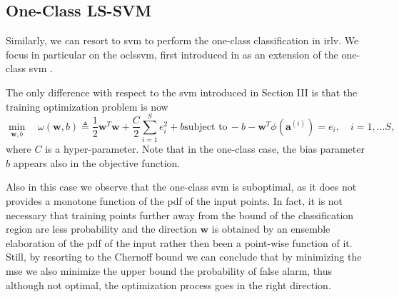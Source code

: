 \documentclass[draftcls,onecolumn,12pt]{IEEEtran}
\begin{document}
\subsection{One-Class LS-SVM}

Similarly, we can resort to \ac{svm} to perform the one-class classification in \ac{irlv}. We focus in particular on the  \ac{oclssvm}, first introduced in \cite{choi2009least} as an extension of the one-class \ac{svm} \cite{Scholkopf2001estimating}. 

The only difference with respect to the \ac{svm} introduced in Section III is that the training optimization problem is now
\begin{subequations}
	\label{eq:oneClassSvm}
	\begin{equation}
	\label{eq:oneClass1}
	\underset{\bm{w},b}{\min} \quad \omega(\bm{w}, b) \triangleq
	 \frac{1}{2} \bm{w}^T \bm{w} +  \frac{C}{2} \sum_{i=1}^S e_i^2 +b
	\end{equation}
	\begin{equation}
	\label{eq:oneClassConstr}
	\text{subject to}\, -b - \bm{w}^T \phi (\bm{a}^{(i)})  = e_i,  \quad i = 1,\dots S, 
	\end{equation}
\end{subequations}
where $C$ is a hyper-parameter.
Note that in the one-class case, the bias parameter $b$ appears also in the objective function.


Also in this case we observe that the one-class \ac{svm} is suboptimal, as it does not provides a monotone function of the \ac{pdf} of the input points. In fact, it is not necessary that  training points further away from the bound of the classification region are less probability and the direction $\bm{w}$ is obtained by an ensemble elaboration of the \ac{pdf} of the input rather then been a point-wise function of it. Still, by resorting to the Chernoff bound we can conclude that by minimizing the \ac{mse} we also minimize the upper bound the probability of false alarm, thus although not optimal, the optimization process goes in the right direction.
\end{document}
